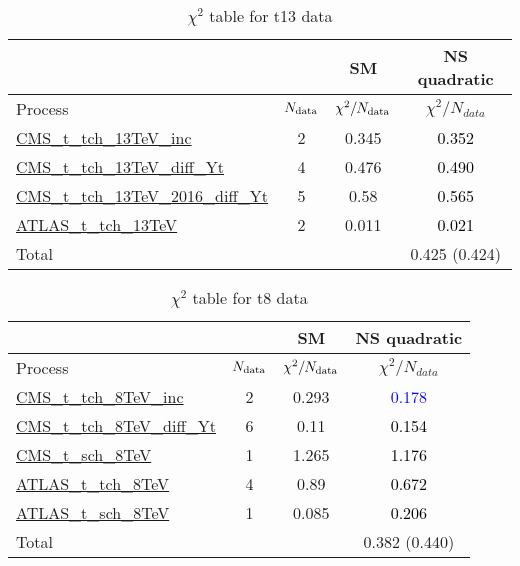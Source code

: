 \documentclass{article}
\begin{document}
\begin{table}[H]
\centering
\begin{tabular}{|l|c|c|c|}
\hline
 \multicolumn{2}{|c|}{} & SM& NS quadratic\\ \hline
Process & $N_{\rm data}$ & $\chi^ 2/N_{\rm data}$& $\chi^ 2/N_{data}$\\ \hline
\href{https://arxiv.org/abs/1610.00678}{CMS_t_tch_13TeV_inc} & 2 & 0.345 & \textcolor{black}{0.352} \\ \hline
\href{https://cds.cern.ch/record/2151074}{CMS_t_tch_13TeV_diff_Yt} & 4 & 0.476 & \textcolor{black}{0.490} \\ \hline
\href{https://arxiv.org/abs/1907.08330}{CMS_t_tch_13TeV_2016_diff_Yt} & 5 & 0.58 & \textcolor{black}{0.565} \\ \hline
\href{https://arxiv.org/abs/1609.03920}{ATLAS_t_tch_13TeV} & 2 & 0.011 & \textcolor{black}{0.021} \\ \hline
\hline Total & &  & 0.425 (0.424) \\ \hline
\end{tabular}
\caption{$\chi^2$ table for t13 data}
\end{table}
\begin{table}[H]
\centering
\begin{tabular}{|l|c|c|c|}
\hline
 \multicolumn{2}{|c|}{} & SM& NS quadratic\\ \hline
Process & $N_{\rm data}$ & $\chi^ 2/N_{\rm data}$& $\chi^ 2/N_{data}$\\ \hline
\href{https://arxiv.org/abs/1403.7366}{CMS_t_tch_8TeV_inc} & 2 & 0.293 & \textcolor{blue}{0.178} \\ \hline
\href{https://cds.cern.ch/record/1956681}{CMS_t_tch_8TeV_diff_Yt} & 6 & 0.11 & \textcolor{black}{0.154} \\ \hline
\href{https://arxiv.org/abs/1603.02555}{CMS_t_sch_8TeV} & 1 & 1.265 & \textcolor{black}{1.176} \\ \hline
\href{https://arxiv.org/abs/1702.02859}{ATLAS_t_tch_8TeV} & 4 & 0.89 & \textcolor{black}{0.672} \\ \hline
\href{https://arxiv.org/abs/1511.05980}{ATLAS_t_sch_8TeV} & 1 & 0.085 & \textcolor{black}{0.206} \\ \hline
\hline Total & &  & 0.382 (0.440) \\ \hline
\end{tabular}
\caption{$\chi^2$ table for t8 data}
\end{table}
\end{document}
